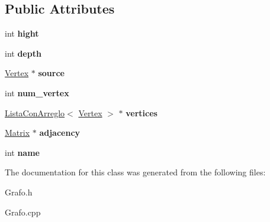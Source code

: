 \subsection*{Public Attributes}
\begin{DoxyCompactItemize}
\item 
\hypertarget{class_grafo_a2243cfbcfea660a6687783a3c8753766}{int {\bfseries hight}}\label{class_grafo_a2243cfbcfea660a6687783a3c8753766}

\item 
\hypertarget{class_grafo_ab284ac0fb5c14d9674413fa0ef5beae9}{int {\bfseries depth}}\label{class_grafo_ab284ac0fb5c14d9674413fa0ef5beae9}

\item 
\hypertarget{class_grafo_a27490ad976e4f9842df42be89647c5a3}{\hyperlink{class_vertex}{Vertex} $\ast$ {\bfseries source}}\label{class_grafo_a27490ad976e4f9842df42be89647c5a3}

\item 
\hypertarget{class_grafo_a2d8334d243cc65e35b37549b8e4f1244}{int {\bfseries num\+\_\+vertex}}\label{class_grafo_a2d8334d243cc65e35b37549b8e4f1244}

\item 
\hypertarget{class_grafo_a0f3fd7c3cd439278b331d799edaa5295}{\hyperlink{class_lista_con_arreglo}{Lista\+Con\+Arreglo}$<$ \hyperlink{class_vertex}{Vertex} $>$ $\ast$ {\bfseries vertices}}\label{class_grafo_a0f3fd7c3cd439278b331d799edaa5295}

\item 
\hypertarget{class_grafo_a83302ee3c077c1047fc48396e3d91f49}{\hyperlink{class_matrix}{Matrix} $\ast$ {\bfseries adjacency}}\label{class_grafo_a83302ee3c077c1047fc48396e3d91f49}

\item 
\hypertarget{class_grafo_a78acf4713466a323c53f6e549e8ec290}{int {\bfseries name}}\label{class_grafo_a78acf4713466a323c53f6e549e8ec290}

\end{DoxyCompactItemize}


The documentation for this class was generated from the following files\+:\begin{DoxyCompactItemize}
\item 
Grafo.\+h\item 
Grafo.\+cpp\end{DoxyCompactItemize}
